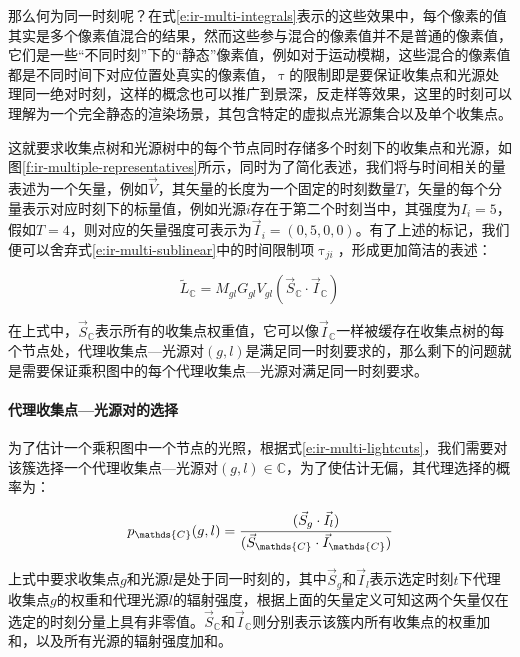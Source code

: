 那么何为同一时刻呢？在式\ref{e:ir-multi-integrals}表示的这些效果中，每个像素的值其实是多个像素值混合的结果，然而这些参与混合的像素值并不是普通的像素值，它们是一些“不同时刻”下的“静态”像素值，例如对于运动模糊，这些混合的像素值都是不同时间下对应位置处真实的像素值，$\uptau$的限制即是要保证收集点和光源处理同一绝对时刻，这样的概念也可以推广到景深，反走样等效果，这里的时刻可以理解为一个完全静态的渲染场景，其包含特定的虚拟点光源集合以及单个收集点。

这就要求收集点树和光源树中的每个节点同时存储多个时刻下的收集点和光源，如图\ref{f:ir-multiple-representatives}所示，同时为了简化表述，我们将与时间相关的量表述为一个矢量，例如$\vec{V}$，其矢量的长度为一个固定的时刻数量$T$，矢量的每个分量表示对应时刻下的标量值，例如光源$i$存在于第二个时刻当中，其强度为$I_i=5$，假如$T=4$，则对应的矢量强度可表示为$\vec{I}_i=(0,5,0,0)$。有了上述的标记，我们便可以舍弃式\ref{e:ir-multi-sublinear}中的时间限制项$\uptau_{ji}$，形成更加简洁的表述：

\begin{equation}\label{e:ir-multi-lightcuts}
	\tilde{L}_{\mathds{C}}=M_{gl}G_{gl}V_{gl}(\vec{S}_{\mathds{C}}\cdot \vec{I}_{\mathds{C}})
\end{equation}

\noindent 在上式中，$\vec{S}_{\mathds{C}}$表示所有的收集点权重值，它可以像$\vec{I}_{\mathds{C}}$一样被缓存在收集点树的每个节点处，代理收集点—光源对$(g,l)$是满足同一时刻要求的，那么剩下的问题就是需要保证乘积图中的每个代理收集点—光源对满足同一时刻要求。




\paragraph{代理收集点—光源对的选择}
为了估计一个乘积图中一个节点的光照，根据式\ref{e:ir-multi-lightcuts}，我们需要对该簇选择一个代理收集点—光源对$(g,l)\in\mathds{C}$，为了使估计无偏，其代理选择的概率为：

\begin{equation}
	p_{\mathds{C}}(g,l)= \cfrac{(\vec{S}_g \cdot \vec{I}_l)}{(\vec{S}_{\mathds{C}}\cdot \vec{I}_{\mathds{C}})}
\end{equation}

\noindent 上式中要求收集点$g$和光源$l$是处于同一时刻的，其中$\vec{S}_g$和$\vec{I}_l$表示选定时刻$t$下代理收集点$g$的权重和代理光源$l$的辐射强度，根据上面的矢量定义可知这两个矢量仅在选定的时刻分量上具有非零值。$\vec{S}_{\mathds{C}}$和$\vec{I}_{\mathds{C}}$则分别表示该簇内所有收集点的权重加和，以及所有光源的辐射强度加和。

